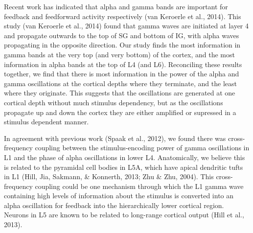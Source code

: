 Recent work has indicated that alpha and gamma bands are important for feedback and feedforward activity respectively (van Keroerle et al., 2014). This study (van Keroerle et al., 2014) found that gamma waves are initiated at layer 4 and propagate outwards to the top of SG and bottom of IG, with alpha waves propagating in the opposite direction. Our study finds the most information in gamma bands at the very top (and very bottom) of the cortex, and the most information in alpha bands at the top of L4 (and L6). Reconciling these results together, we find that there is most information in the power of the alpha and gamma oscillations at the cortical depths where they terminate, and the least where they originate. This suggests that the oscillations are generated at one cortical depth without much stimulus dependency, but as the oscillations propagate up and down the cortex they are either amplified or supressed in a stimulus dependent manner.

In agreement with previous work (Spaak et al., 2012), we found there was cross-frequency coupling between the stimulus-encoding power of gamma oscillations in L1 and the phase of alpha oscillations in lower L4. Anatomically, we believe this is related to the pyramidal cell bodies in L5A, which have apical dendritic tufts in L1 (Hill, Jia, Sakmann, \& Konnerth, 2013; Zhu \& Zhu, 2004). This cross-frequency coupling could be one mechanism through which the L1 gamma wave containing high levels of information about the stimulus is converted into an alpha oscillation for feedback into the hierarchically lower cortical region. Neurons in L5 are known to be related to long-range cortical output (Hill et al., 2013). 

%

